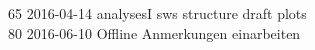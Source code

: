 \begin{titlepage}
\begin{footnotesize}
65	2016-04-14	analysesI sws structure draft plots\\
80	2016-06-10	Offline Anmerkungen einarbeiten\\

\end{footnotesize}
\end{titlepage}
